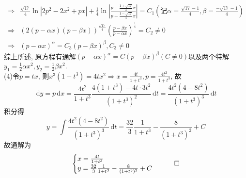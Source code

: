 \documentclass[titlepage,11pt,a4paper,twoside]{report}
\makeatletter
\newcommand\diff{\,\mathrm{d}}
\renewenvironment{proof}{\par
	\pushQED{\qed}%
	\normalfont \topsep1\p@\@plus6\p@\relax
	\trivlist
	\item\relax
	{\hspace*{\parindent}{\heiti 证明}\@addpunct{:}}\hspace\labelsep\ignorespaces
}{%
	\popQED\endtrivlist\@endpefalse
}
\makeatother
\begin{document}
\begin{proof}
\[\begin{split}
\Rightarrow&\frac{\sqrt{17}}{4}\ln|2p^2-2x^2+px|+\frac{1}{4}\ln\left|\frac{p+\frac{1+\sqrt{17}}{4}x}{p+\frac{1-\sqrt{17}}{4}x}\right|=C_1\left(记\alpha=\frac{\sqrt{17}-1}{4},\beta=\frac{-\sqrt{17}-1}{4}\right)\\
\Rightarrow&(2(p-\alpha x)(p-\beta x))^{\frac{\sqrt{17}}{4}}\left(\frac{p-\beta x}{p-\alpha x}\right)^{\frac{1}{4}}=C_2\neq0\\
\Rightarrow&(p-\alpha x)^{\alpha}=C_3(p-\beta x)^{\beta},C_3\neq0
\end{split}\]
综上所述, 原方程有通解$(p-\alpha x)^{\alpha}=C(p-\beta x)^{\beta}(C\neq0)$以及两个特解$y_1=\frac{1}{2}\alpha x^2,y_2=\frac{1}{2}\beta x^2$.\\
(4)令$p=tx$, 则$x^3(1+t^3)=4tx^2\Rightarrow x=\frac{4t}{1+t^3},p=\frac{4t^2}{1+t^3}$, 故
\[\diff y=p\diff x=\frac{4t^2}{1+t^3}\frac{4(1+t^3)-4t\cdot3t^2}{(1+t^3)^2}\diff t=\frac{4t^2(4-8t^2)}{(1+t^3)^3}\diff t\]
积分得
\[y=\int\frac{4t^2(4-8t^2)}{(1+t^3)^3}\diff t=\frac{32}{3}\frac{1}{1+t^3}-\frac{8}{(1+t^3)^2}+C\]
故通解为\[\begin{cases}
x=\frac{4t}{1+t^3}\\y=\frac{32}{3}\frac{1}{1+t^3}-\frac{8}{(1+t^3)^2}+C
\end{cases}\qedhere\]
\end{proof}
\end{document}
